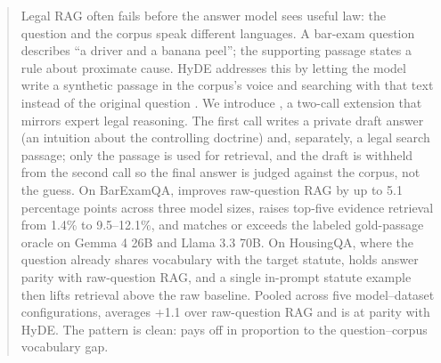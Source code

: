 \begin{abstract}
Legal RAG often fails before the answer model sees useful law: the question
and the corpus speak different languages. A bar-exam question describes
``a driver and a banana peel''; the supporting passage states a rule about
proximate cause. HyDE addresses this by letting the model write a synthetic
passage in the corpus's voice and searching with that text instead of the
original question \citep{gao2023hyde}. We introduce \hyre{}, a two-call
extension that mirrors expert legal reasoning. The first call writes a
private draft answer (an intuition about the controlling doctrine) and,
separately, a legal search passage; only the passage is used for retrieval,
and the draft is withheld from the second call so the final answer is judged
against the corpus, not the guess. On BarExamQA, \hyre{} improves
raw-question RAG by up to 5.1 percentage points across three model sizes,
raises top-five evidence retrieval from 1.4\% to 9.5--12.1\%, and matches or
exceeds the labeled gold-passage oracle on Gemma 4 26B and Llama 3.3 70B. On
HousingQA, where the question already shares vocabulary with the target
statute, \hyre{} holds answer parity with raw-question RAG, and a single
in-prompt statute example then lifts retrieval above the raw baseline.
Pooled across five model--dataset configurations, \hyre{} averages +1.1\pp{}
over raw-question RAG and is at parity with HyDE. The pattern is clean:
\hyre{} pays off in proportion to the question--corpus vocabulary gap.
\end{abstract}
